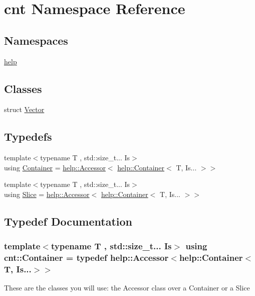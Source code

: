 \hypertarget{namespacecnt}{}\section{cnt Namespace Reference}
\label{namespacecnt}
\subsection*{Namespaces}
\begin{DoxyCompactItemize}
\item 
 \hyperlink{namespacecnt_1_1help}{help}
\end{DoxyCompactItemize}
\subsection*{Classes}
\begin{DoxyCompactItemize}
\item 
struct \hyperlink{structcnt_1_1Vector}{Vector}
\end{DoxyCompactItemize}
\subsection*{Typedefs}
{\bf }\par
\begin{DoxyCompactItemize}
\item 
{\footnotesize template$<$typename T , std\+::size\+\_\+t... Is$>$ }\\using \hyperlink{namespacecnt_a2582b86fe1f438d9fb02dd7e34f4ccbd}{Container} = \hyperlink{structcnt_1_1help_1_1Accessor}{help\+::\+Accessor}$<$ \hyperlink{classcnt_1_1help_1_1Container}{help\+::\+Container}$<$ T, Is... $>$$>$
\item 
{\footnotesize template$<$typename T , std\+::size\+\_\+t... Is$>$ }\\using \hyperlink{namespacecnt_acf6d6a181a8c170689b959f3d6a36813}{Slice} = \hyperlink{structcnt_1_1help_1_1Accessor}{help\+::\+Accessor}$<$ \hyperlink{classcnt_1_1help_1_1Container}{help\+::\+Container}$<$ T, Is... $>$$>$
\end{DoxyCompactItemize}



\subsection{Typedef Documentation}
\subsubsection[{\texorpdfstring{Container}{Container}}]{\setlength{\rightskip}{0pt plus 5cm}template$<$typename T , std\+::size\+\_\+t... Is$>$ using {\bf cnt\+::\+Container} = typedef {\bf help\+::\+Accessor}$<${\bf help\+::\+Container}$<$T, Is...$>$$>$}\hypertarget{namespacecnt_a2582b86fe1f438d9fb02dd7e34f4ccbd}{}\label{namespacecnt_a2582b86fe1f438d9fb02dd7e34f4ccbd}
These are the classes you will use\+: the \textquotesingle{}Accessor\textquotesingle{} class over a \textquotesingle{}Container\textquotesingle{} or a \textquotesingle{}Slice\textquotesingle{} 
